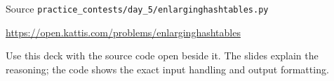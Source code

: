 \documentclass[aspectratio=169,11pt]{beamer}
\begin{document}
\begin{frame}{Source}
\small
{} \texttt{practice\_contests/day\_5/enlarginghashtables.py}

\vspace{0.3cm}
 \url{https://open.kattis.com/problems/enlarginghashtables}

\vspace{0.45cm}
Use this deck with the source code open beside it. The slides explain the reasoning; the code shows the exact input handling and output formatting.
\end{frame}
\end{document}
